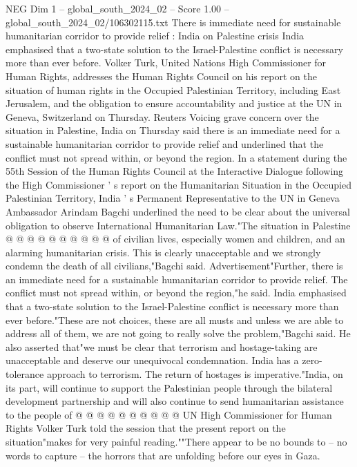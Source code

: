\begin{textsample}{NEG Dim 1 – global\_south\_2024\_02 – Score 1.00 – global\_south\_2024\_02/106302115.txt}  \label{ex:f1_neg_248}
There is immediate need for sustainable humanitarian corridor to provide relief : India on Palestine crisis India emphasised that a two-state solution to the Israel-Palestine conflict is necessary more than ever before.
Volker Turk, United Nations High Commissioner for Human Rights, addresses the Human Rights Council on his report on the situation of human rights in the Occupied Palestinian Territory, including East Jerusalem, and the obligation to ensure accountability and justice at the UN in Geneva, Switzerland on Thursday.
Reuters Voicing grave concern over the situation in Palestine, India on Thursday said there is an immediate need for a sustainable humanitarian corridor to provide relief and underlined that the conflict must not spread within, or beyond the region.
In a statement during the 55th Session of the Human Rights Council at the Interactive Dialogue following the High Commissioner ' s report on the Humanitarian Situation in the Occupied Palestinian Territory, India ' s Permanent Representative to the UN in Geneva Ambassador Arindam Bagchi underlined the need to be clear about the universal obligation to observe International Humanitarian Law."The situation in Palestine @ @ @ @ @ @ @ @ @ @ of civilian lives, especially women and children, and an alarming humanitarian crisis.
This is clearly unacceptable and we strongly condemn the death of all civilians,"Bagchi said.
Advertisement"Further, there is an immediate need for a sustainable humanitarian corridor to provide relief.
The conflict must not spread within, or beyond the region,"he said.
India emphasised that a two-state solution to the Israel-Palestine conflict is necessary more than ever before."These are not choices, these are all musts and unless we are able to address all of them, we are not going to really solve the problem,"Bagchi said.
He also asserted that"we must be clear that terrorism and hostage-taking are unacceptable and deserve our unequivocal condemnation.
India has a zero-tolerance approach to terrorism.
The return of hostages is imperative."India, on its part, will continue to support the Palestinian people through the bilateral development partnership and will also continue to send humanitarian assistance to the people of @ @ @ @ @ @ @ @ @ @ UN High Commissioner for Human Rights Volker Turk told the session that the present report on the situation"makes for very painful reading.""There appear to be no bounds to -- no words to capture -- the horrors that are unfolding before our eyes in Gaza.

\end{textsample}
